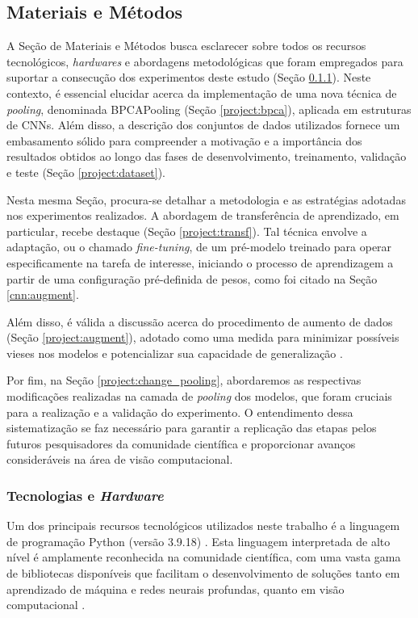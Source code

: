 \subsection{Materiais e Métodos}
\label{project:matmet}
A Seção de Materiais e Métodos busca esclarecer sobre todos os recursos tecnológicos, \textit{hardwares} e abordagens metodológicas que foram empregados para suportar a consecução dos experimentos deste estudo (Seção \ref{project:techard}). Neste contexto, é essencial elucidar acerca da implementação de uma nova técnica de \textit{pooling}, denominada BPCAPooling (Seção \ref{project:bpca}), aplicada em estruturas de CNNs. Além disso, a descrição dos conjuntos de dados utilizados fornece um embasamento sólido para compreender a motivação e a importância dos resultados obtidos ao longo das fases de desenvolvimento, treinamento, validação e teste (Seção \ref{project:dataset}).

Nesta mesma Seção, procura-se detalhar a metodologia e as estratégias adotadas nos experimentos realizados. A abordagem de transferência de aprendizado, em particular, recebe destaque (Seção \ref{project:transf}). Tal técnica envolve a adaptação, ou o chamado \textit{fine-tuning}, de um pré-modelo treinado para operar especificamente na tarefa de interesse, iniciando o processo de aprendizagem a partir de uma configuração pré-definida de pesos, como foi citado na Seção \ref{cnn:augment}.

Além disso, é válida a discussão acerca do procedimento de aumento de dados (Seção \ref{project:augment}), adotado como uma medida para minimizar possíveis vieses nos modelos e potencializar sua capacidade de generalização \citep{Shorten2019ALearning}.

Por fim, na Seção \ref{project:change_pooling}, abordaremos as respectivas modificações realizadas na camada de \textit{pooling} dos modelos, que foram cruciais para a realização e a validação do experimento. O entendimento dessa sistematização se faz necessário para garantir a replicação das etapas pelos futuros pesquisadores da comunidade científica e proporcionar avanços consideráveis na área de visão computacional.

\subsubsection{Tecnologias e \textit{Hardware}}
\label{project:techard}
Um dos principais recursos tecnológicos utilizados neste trabalho é a linguagem de programação Python (versão 3.9.18) \citep{VanRossum2009PythonManual}. Esta linguagem interpretada de alto nível é amplamente reconhecida na comunidade científica, com uma vasta gama de bibliotecas disponíveis que facilitam o desenvolvimento de soluções tanto em aprendizado de máquina e redes neurais profundas, quanto em visão computacional \citep{Millman2011PythonEngineers, Perkel2015Programming:Python}.

